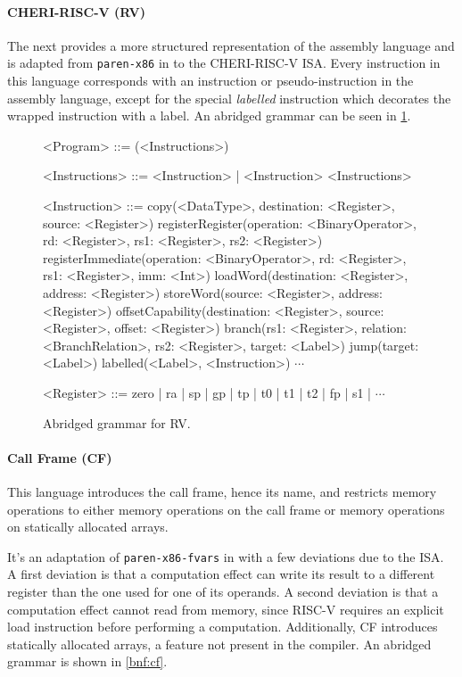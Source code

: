 \documentclass[main.tex]{subfiles}
\begin{document}
\paragraph{CHERI-RISC-V (RV)} The next \il{} provides a more structured representation of the assembly language and is adapted from \texttt{paren-x86} in \cite{:compcourse} to the CHERI-RISC-V ISA. Every instruction in this language corresponds with an instruction or pseudo-instruction in the assembly language, except for the special \emph{labelled} instruction which decorates the wrapped instruction with a label. An abridged grammar can be seen in \cref{bnf:rv}.
\begin{figure}[ht]
	\begin{grammar}
		
		<Program> ::= (<Instructions>)
		
		<Instructions> ::= <Instruction> | <Instruction> <Instructions>
		
		<Instruction> ::= copy(<DataType>, destination: <Register>, source: <Register>)
			\alt registerRegister(operation: <BinaryOperator>, rd: <Register>, rs1: <Register>, rs2: <Register>)
			\alt registerImmediate(operation: <BinaryOperator>, rd: <Register>, rs1: <Register>, imm: <Int>)
			\alt loadWord(destination: <Register>, address: <Register>)
			\alt storeWord(source: <Register>, address: <Register>)
			\alt offsetCapability(destination: <Register>, source: <Register>, offset: <Register>)
			\alt branch(rs1: <Register>, relation: <BranchRelation>, rs2: <Register>, target: <Label>)
			\alt jump(target: <Label>)
			\alt labelled(<Label>, <Instruction>)
			\alt $\cdots$
			
		<Register> ::= zero | ra | sp | gp | tp | t0 | t1 | t2 | fp | s1 | $\cdots$
		
	\end{grammar}
	\caption{Abridged grammar for RV.}
	\label{bnf:rv}
\end{figure}

\paragraph{Call Frame (CF)} This language introduces the call frame, hence its name, and restricts memory operations to either memory operations on the call frame or memory operations on statically allocated arrays.

It's an adaptation of \texttt{paren-x86-fvars} in \cite{:compcourse} with a few deviations due to the ISA. A first deviation is that a computation effect can write its result to a different register than the one used for one of its operands. A second deviation is that a computation effect cannot read from memory, since RISC-V requires an explicit load instruction before performing a computation. Additionally, CF introduces statically allocated arrays, a feature not present in the \cite{:compcourse} compiler. An abridged grammar is shown in \cref{bnf:cf}.
\end{document}
